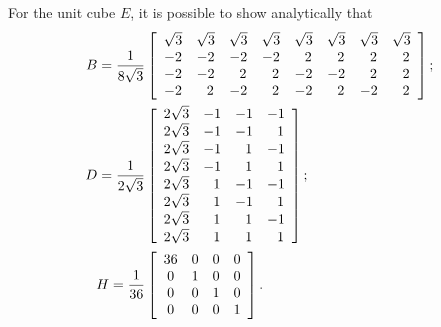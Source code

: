 \documentclass[a4paper]{article}
\begin{document}
\noindent
For the unit cube $E$,  it is possible to show analytically that
\begin{align}
B = \frac{1}{8\sqrt{3}}&\left[\begin{array}{c c c c c c c c}
\sqrt{3} & \sqrt{3} & \sqrt{3} & \sqrt{3} & \sqrt{3} & \sqrt{3} & \sqrt{3} & \sqrt{3}\\
-2 & -2 & -2 & -2 & \ \ 2 & \ \ 2 & \ \ 2 & \ \ 2\\
-2 & -2 & \ \ 2 & \ \ 2 & -2 & -2 & \ \ 2 & \ \ 2\\
-2 & \ \ 2 & -2 & \ \ 2 & -2 & \ \ 2 & -2 & \ \ 2\\
\end{array}\right];\\
%
D = \frac{1}{2\sqrt{3}}&\left[\begin{array}{c c c c}
2\sqrt{3} & -1 & -1 & -1\\
2\sqrt{3} & -1 & -1 & \ \ 1\\
2\sqrt{3} & -1 & \ \ 1 & -1\\
2\sqrt{3} & -1 & \ \ 1 & \ \ 1\\
2\sqrt{3} & \ \ 1 & -1 & -1\\
2\sqrt{3} & \ \ 1 & -1 & \ \ 1\\
2\sqrt{3} & \ \ 1 & \ \ 1 & -1\\
2\sqrt{3} & \ \ 1 & \ \ 1 & \ \ 1
\end{array}\right];\\
%
H = \frac{1}{36}&\left[\begin{array}{c c c c}
36 & 0 & 0 & 0\\
0 & 1 & 0 & 0\\
0 & 0 & 1 & 0\\
0 & 0 & 0 & 1
\end{array}\right].
\end{align}
\end{document}
